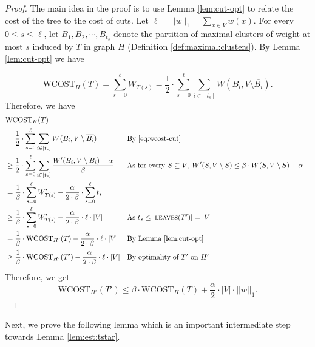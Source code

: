 \documentclass[letterpaper,11pt]{article}
\newcommand{\wCT}{\text{WCOST}}
\newcommand{\lv}{\textsc{leaves}}
\theoremstyle{plain}
\theoremstyle{definition}
\theoremstyle{remark}
\begin{document}
\begin{proof}
	The main idea in the proof is to use Lemma \ref{lem:cut-opt} to relate the cost of the tree to the cost of cuts. 
Let $\ell=||w||_1=\sum_{x\in V} w(x)$. For every $0\leq s\leq \ell$, let $B_1, B_2, \cdots, B_{t_s}$ denote the partition of maximal clusters of weight at most $s$
	induced by $T$ in graph $H$ (Definition \ref{def:maximal:clusters}). By Lemma \ref{lem:cut-opt} we have

\begin{equation}
\label{eq:wcost-cut}
\wCT_{H}(T) = \sum_{s=0}^{\ell} W_{T(s)} =  
	\frac{1}{2}\cdot \sum_{s=0}^{\ell} \sum_{i \in [t_s]} W(B_i, V\setminus \overline{B_i})\text{.}
\end{equation}
Therefore, we have
	\begin{align*}
	&\wCT_{H}(T) \\
	&= 	\frac{1}{2}\cdot \sum_{s=0}^{\ell} \sum_{i \in [t_s]} W(B_i, V\setminus \overline{B_i}) &&\text{By \eqref{eq:wcost-cut}}\\
	&\geq \frac{1}{2} \cdot \sum_{s=0}^{\ell} \sum_{i \in [t_s]} \frac{W'(B_i, V\setminus \overline{B_i})-\alpha}{\beta}   &&\text{As for every $S\subseteq V $, $ W'(S,V\setminus S) \leq \beta \cdot W(S,V\setminus S) + \alpha$} \\
		&= \frac{1}{\beta}\cdot \sum_{s=0}^{\ell}  W'_{T(s)} - \frac{\alpha}{2\cdot \beta} \cdot \sum_{s = 0}^{\ell} t_s \\
		&\geq \frac{1}{\beta}\cdot \sum_{s=0}^{\ell}  W'_{T(s)} - \frac{\alpha}{2\cdot \beta} \cdot \ell\cdot |V| &&\text{As $t_s\leq |\lv(T')|=|V|$}\\
		& = \frac{1}{\beta} \cdot \wCT_{H'}(T) - \frac{\alpha}{2\cdot \beta} \cdot \ell\cdot |V|  &&\text{By Lemma \ref{lem:cut-opt}}\\
		& \geq \frac{1}{\beta} \cdot \wCT_{H'}(T') -  \frac{\alpha}{2\cdot \beta} \cdot \ell\cdot |V| &&\text{By optimality of  $T'$ on $H'$}
	\end{align*}
	Therefore, we get
\[ \wCT_{H'}(T') \leq \beta\cdot \wCT_{H}(T) + \frac{\alpha}{2} \cdot |V|\cdot ||w||_1 \text{.}\]
\end{proof}



Next, we prove the following lemma which is an important intermediate step towards Lemma \ref{lem:est:tstar}.
\end{document}

